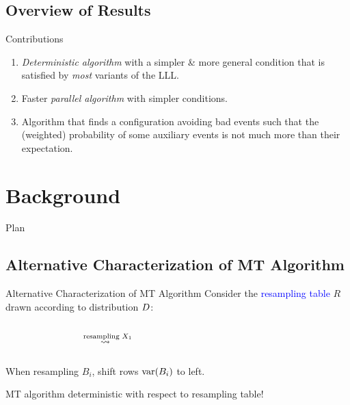 \documentclass{beamer}
\def\padding{\vspace{0.5cm}}
\def\spadding{\vspace{0.25cm}}
\def\b{\textcolor{blue}}
\begin{document}
\subsection{Overview of Results}
\begin{frame}{Contributions}
\begin{enumerate}
    \item \emph{Deterministic algorithm} with a simpler \& more general condition that is satisfied by \emph{most} variants of the LLL.\pause
    \item Faster \emph{parallel algorithm} with simpler conditions.\pause
    \item Algorithm that finds a configuration avoiding bad events such that the (weighted) probability of some auxiliary events is not much more than their expectation.
\end{enumerate}
\end{frame}

\section{Background}
\begin{frame}{Plan}
\tableofcontents[currentsection, sectionstyle=show/shaded, hideothersubsections]
\end{frame}

\subsection{Alternative Characterization of MT Algorithm}
\begin{frame}{Alternative Characterization of MT Algorithm}
Consider the \b{resampling table} $R$ drawn according to distribution $D$:\spadding

\begin{columns}
\begin{column}{.25\textwidth}
\vspace{0.15em}\pause
\end{column}\pause
\begin{column}{.1\textwidth}
\centering $\overset{\text{resampling $X_1$}}{\rightsquigarrow\hspace{0.5em}}$
\end{column}
\begin{column}{.3\textwidth}

\end{column}
\begin{column}{.05\textwidth}
\end{column}
\end{columns}\pause

When resampling $B_i$, shift rows $\mathrm{var}(B_i)$ to left.\pause\padding

\follows MT algorithm deterministic with respect to resampling table!
\end{frame}
\end{document}
